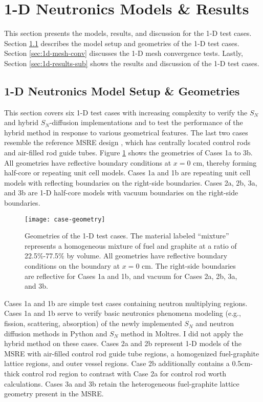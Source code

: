 \section{1-D Neutronics Models \& Results} \label{sec:1d-results}

This section presents the models, results, and discussion for the 1-D test cases. Section
\ref{sec:1d-model-setup} describes the model setup and geometries of the 1-D test cases.
Section \ref{sec:1d-mesh-conv} discusses the 1-D mesh convergence tests. Lastly, Section
\ref{sec:1d-results-sub} shows the results and discussion of the 1-D test cases.

\subsection{1-D Neutronics Model Setup \& Geometries} \label{sec:1d-model-setup}

This section covers six 1-D test cases with increasing complexity to verify the $S_N$ and hybrid
$S_N$-diffusion implementations and to test the performance of the hybrid
method in response to various geometrical features. The last two cases resemble the
reference \gls{MSRE} design \cite{robertson_msre_1965}, which has centrally located control rods
and air-filled rod guide tubes. Figure \ref{fig:case-geom} shows the geometries of Cases 1a to
3b. All geometries have reflective boundary conditions at $x=0$ cm, thereby
forming half-core or repeating unit cell models. Cases 1a and 1b are repeating unit
cell models with reflecting boundaries on the right-side boundaries. Cases 2a, 2b, 3a, and 3b
are 1-D half-core models with vacuum boundaries on the right-side boundaries.

\begin{figure}[htb!]
  \centering
  \texttt{[image: case-geometry]}
  \caption{Geometries of the 1-D test cases. The material labeled ``mixture'' represents a
    homogeneous mixture of fuel and graphite at a ratio of 22.5\%-77.5\% by volume. All geometries
    have reflective boundary conditions on the boundary at $x=0$ cm. The right-side boundaries are
    reflective for Cases 1a and 1b, and vacuum for Cases 2a, 2b, 3a, and 3b.}
  \label{fig:case-geom}
\end{figure}

Cases 1a and 1b are simple test cases containing neutron multiplying regions. Cases 1a and 1b serve
to verify basic neutronics phenomena modeling (e.g., fission, scattering, absorption) of the newly
implemented $S_N$ and neutron diffusion methods in Python and $S_N$ method in Moltres. I did not
apply the hybrid method on these cases. Cases 2a and 2b represent 1-D models of the \gls{MSRE} with
air-filled control rod guide tube regions, a homogenized fuel-graphite lattice regions, and outer
vessel regions. Case 2b additionally contains a 0.5cm-thick control rod region to contrast with
Case 2a for control rod worth calculations. Cases 3a and 3b retain the heterogeneous fuel-graphite
lattice geometry present in the \gls{MSRE}.

